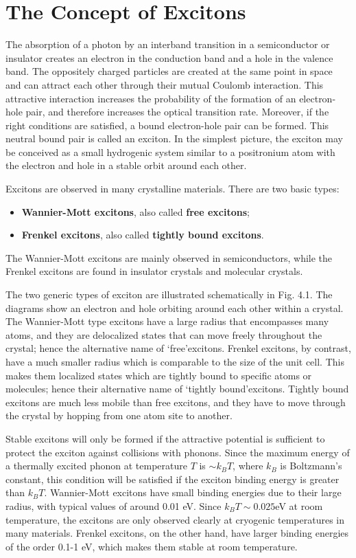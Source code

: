 \documentclass[12pt]{book}
\begin{document}
\section{The Concept of Excitons}

The absorption of a photon by an interband transition in a semiconductor or insulator creates an electron in the conduction band and a hole in the valence band. The oppositely charged particles are created at the same point in space and can attract each other through their mutual Coulomb interaction. This attractive interaction increases the probability of the formation of an electron-hole pair, and therefore increases the optical transition rate. Moreover, if the right conditions are satisfied, a bound electron-hole pair can be formed. This neutral bound pair is called an exciton. In the simplest picture, the exciton may be conceived as a small hydrogenic system similar to a positronium atom with the electron and hole in a stable orbit around each other.

Excitons are observed in many crystalline materials. There are two basic types:
\begin{itemize}
  \item \textbf{Wannier-Mott excitons}, also called \textbf{free excitons};
  \item \textbf{Frenkel excitons}, also called \textbf{tightly bound excitons}.
\end{itemize}
The Wannier-Mott excitons are mainly observed in semiconductors, while the Frenkel excitons are found in insulator crystals and molecular crystals.

The two generic types of exciton are illustrated schematically in Fig. 4.1. The diagrams show an electron and hole orbiting around each other within a crystal. The Wannier-Mott type excitons have a large radius that encompasses many atoms, and they are delocalized states that can move freely throughout the crystal; hence the alternative name of \lq free\rq excitons. Frenkel excitons, by contrast, have a much smaller radius which is comparable to the size of the unit cell. This makes them localized states which are tightly bound to specific atoms or molecules; hence their alternative name of \lq tightly bound\rq excitons. Tightly bound excitons are much less mobile than free excitons, and they have to move through the crystal by hopping from one atom site to another.

Stable excitons will only be formed if the attractive potential is sufficient to protect the exciton against collisions with phonons. Since the maximum energy of a thermally excited phonon at temperature $T$ is $\sim k_BT$, where $k_B$ is Boltzmann's constant, this condition will be satisfied if the exciton binding energy is greater than $k_BT$. Wannier-Mott excitons have small binding energies due to their large radius, with typical values of around 0.01 eV. Since $k_BT\sim 0.025$eV at room temperature, the excitons are only observed clearly at cryogenic temperatures in many materials. Frenkel excitons, on the other hand, have larger binding energies of the order 0.1-1 eV, which makes them stable at room temperature.
\end{document}
